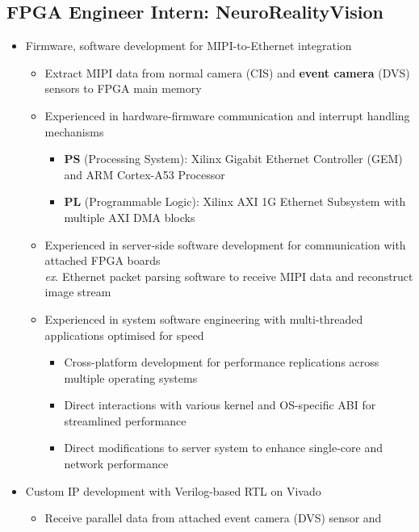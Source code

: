 \documentclass[10pt]{article}
\begin{document}
\subsection*{FPGA Engineer Intern: NeuroRealityVision}
\begin{itemize}
  \item Firmware, software development for MIPI-to-Ethernet integration
    \begin{itemize}
      \item Extract MIPI data from normal camera (CIS) and
        \textbf{event camera} (DVS) sensors to FPGA main memory
      \item Experienced in hardware-firmware communication and interrupt
        handling mechanisms
        \begin{itemize}
          \item \textbf{PS} (Processing System): Xilinx Gigabit Ethernet
            Controller (GEM) and ARM Cortex-A53 Processor
          \item \textbf{PL} (Programmable Logic): Xilinx AXI 1G Ethernet
            Subsystem with multiple AXI DMA blocks
        \end{itemize}
      \item Experienced in server-side software development for communication
        with attached FPGA boards \\
        \textit{ex}. Ethernet packet parsing software to receive MIPI data and
          reconstruct image stream
      \item Experienced in system software engineering with multi-threaded
        applications optimised for speed
        \begin{itemize}
          \item Cross-platform development for performance replications across
            multiple operating systems
          \item Direct interactions with various kernel and OS-specific ABI
            for streamlined performance
          \item Direct modifications to server system to enhance single-core
            and network performance
        \end{itemize}
    \end{itemize}
  \item Custom IP development with Verilog-based RTL on Vivado
    \begin{itemize}
      \item Receive parallel data from attached event camera (DVS) sensor and

\end{itemize}
\end{itemize}
\end{document}
